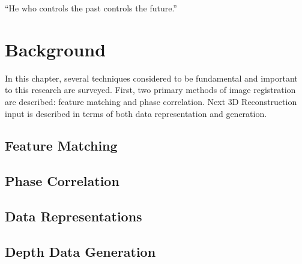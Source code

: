\begin{savequote}[8cm]
  ``He who controls the past controls the future.''
\end{savequote}
\makeatletter
\chapter{Background}

In this chapter, several techniques considered to be fundamental and important to this research are surveyed. First, two primary methods of image registration are described: feature matching and phase correlation. Next 3D Reconstruction input is described in terms of both data representation and generation.\\

\section{Feature Matching}

\section{Phase Correlation}

\section{Data Representations}

\section{Depth Data Generation}
\label{DepthDataGenSection}

